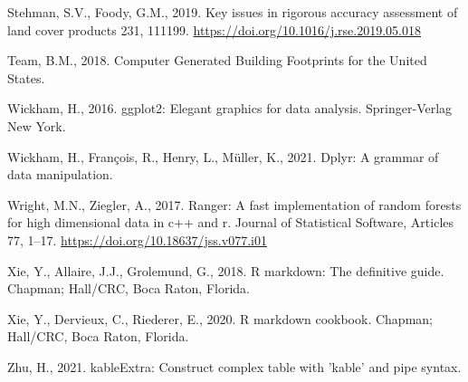 \documentclass[]{elsarticle} %
\newlength{\cslhangindent}
\newenvironment{CSLReferences}[2] %
 {%
  \setlength{\parindent}{0pt}
  \ifodd #1 \everypar{\setlength{\hangindent}{\cslhangindent}}\ignorespaces\fi
  \ifnum #2 > 0
  \setlength{\parskip}{#2\baselineskip}
  \fi
 }%
 {}
\begin{document}
\begin{CSLReferences}{1}{0}
\leavevmode{}%
Stehman, S.V., Foody, G.M., 2019. Key issues in rigorous accuracy assessment of land cover products 231, 111199. \url{https://doi.org/10.1016/j.rse.2019.05.018}

\leavevmode{}%
Team, B.M., 2018. {Computer Generated Building Footprints for the United States.}

\leavevmode{}%
Wickham, H., 2016. ggplot2: Elegant graphics for data analysis. Springer-Verlag New York.

\leavevmode{}%
Wickham, H., François, R., Henry, L., Müller, K., 2021. Dplyr: A grammar of data manipulation.

\leavevmode{}%
Wright, M.N., Ziegler, A., 2017. Ranger: A fast implementation of random forests for high dimensional data in c++ and r. Journal of Statistical Software, Articles 77, 1--17. \url{https://doi.org/10.18637/jss.v077.i01}

\leavevmode{}%
Xie, Y., Allaire, J.J., Grolemund, G., 2018. R markdown: The definitive guide. Chapman; Hall/CRC, Boca Raton, Florida.

\leavevmode{}%
Xie, Y., Dervieux, C., Riederer, E., 2020. R markdown cookbook. Chapman; Hall/CRC, Boca Raton, Florida.

\leavevmode{}%
Zhu, H., 2021. kableExtra: Construct complex table with 'kable' and pipe syntax.

\end{CSLReferences}
\end{document}
